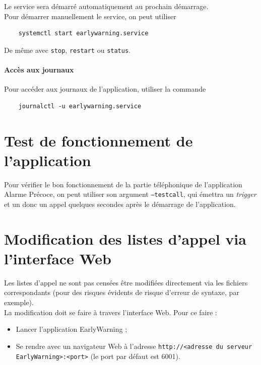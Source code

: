 \documentclass{article}
\begin{document}
Le service sera démarré automatiquement au prochain démarrage. \\
Pour démarrer manuellement le service, on peut utiliser

\begin{verbatim}
    systemctl start earlywarning.service
\end{verbatim}

De même avec \texttt{stop}, \texttt{restart} ou \texttt{status}.

\paragraph{Accès aux journaux} Pour accéder aux journaux de l'application, utiliser la commande

\begin{verbatim}
    journalctl -u earlywarning.service
\end{verbatim}

\pagebreak
\section{Test de fonctionnement de l'application}

Pour vérifier le bon fonctionnement de la partie téléphonique de l'application Alarme Précoce, on peut utiliser son argument \texttt{--testcall}, qui émettra un \emph{trigger} et un donc un appel quelques secondes après le démarrage de l'application.

\pagebreak
\section{Modification des listes d'appel via l'interface Web}

Les listes d'appel ne sont pas censées être modifiées directement via les fichiers correspondants (pour des risques évidents de risque d'erreur de syntaxe, par exemple). \\
La modification doit se faire à travers l'interface Web. Pour ce faire :

\begin{itemize}
    \item Lancer l'application EarlyWarning ;
    \item Se rendre avec un navigateur Web à l'adresse \texttt{http://<adresse du serveur EarlyWarning>:<port>} (le port par défaut est 6001).
\end{itemize}
\end{document}
